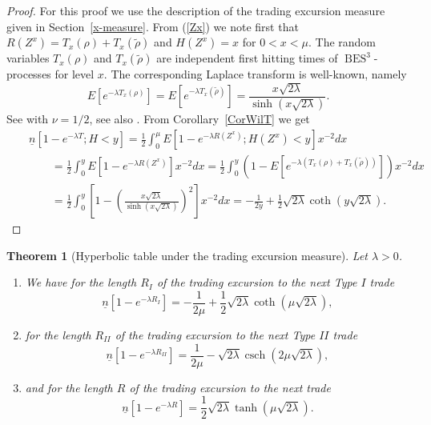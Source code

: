 \documentclass[11pt]{scrartcl}
\newtheorem{theorem}{Theorem}
\newcommand{\nbid}{\underline{n}}
\DeclareMathOperator{\BES}{BES}
\DeclareMathOperator{\csch}{csch}
\begin{document}
\begin{proof}
For this proof we use the description of the trading excursion measure given
in Section~\ref{x-measure}.
From (\ref{Zx}) we note first that $R(Z^x)=T_x(\rho)+T_x(\tilde\rho)$ 
and $H(Z^x)=x$ for $0<x<\mu$.
The random variables $T_x(\rho)$ and $T_x(\tilde\rho)$ are independent
first hitting times of $\BES^3$-processes for level $x$.
The corresponding Laplace transform is well-known, namely
\begin{equation}
E[e^{-\lambda T_x(\rho)}]=
E[e^{-\lambda T_x(\tilde\rho)}]=
\frac{x\sqrt{2\lambda}}{\sinh(x\sqrt{2\lambda})}.
\end{equation}
See \cite[(3.8), p.762]{Ken1978} with $\nu=1/2$,
see also \cite[Tab.2, Row 3, Col.1, p.450 and Sec.4.5, p.453]{BPY2001}.
From Corollary~\ref{CorWilT} we get
\begin{eqnarray}
&&\nbid[1-e^{-\lambda T};H<y]
=
\frac12\int_0^\mu E[1-e^{-\lambda R(Z^x)};H(Z^x)<y]x^{-2}dx\\
&&\qquad=
\frac12\int_0^y E[1-e^{-\lambda R(Z^x)}]x^{-2}dx
=
\frac12\int_0^y
\left(
1-E\left[e^{-\lambda (T_x(\rho)+T_x(\tilde\rho))}\right]
\right)x^{-2}dx\\
&&\qquad=
\frac12\int_0^y\left[
1-\left(\frac{x\sqrt{2\lambda}}{\sinh(x\sqrt{2\lambda})}\right)^2
\right]x^{-2}dx
=
-\frac1{2y}+\frac12\sqrt{2\lambda}\coth(y\sqrt{2\lambda}).
\end{eqnarray}
\end{proof}

\begin{theorem}[Hyperbolic table under the trading excursion measure]
Let $\lambda>0$.\label{nhyp}

\begin{enumerate}
\item \label{nTI} We have for the length $R_{I}$ of the trading excursion to
the next Type $I$ trade
\begin{equation}
\underline{n}[1-e^{-\lambda R_{I}}]=-\frac{1}{2\mu }+\frac{1}{2}\sqrt{2\lambda }\coth (\mu \sqrt{2\lambda }),  \label{coth}
\end{equation}

\item \label{nTII} for the length $R_{II}$ of the trading excursion to the
next Type $II$ trade 
\begin{equation}
\underline{n}[1-e^{-\lambda R_{II}}]=\frac{1}{2\mu }-\sqrt{2\lambda }\csch(2\mu \sqrt{2\lambda }),  \label{csch}
\end{equation}

\item \label{nT} and for the length $R$ of the trading excursion to the next
trade 
\begin{equation}
\underline{n}[1-e^{-\lambda R}]=\frac{1}{2}\sqrt{2\lambda }\tanh (\mu \sqrt{2\lambda}).  \label{tanh}
\end{equation}
\end{enumerate}
\end{theorem}
\end{document}
